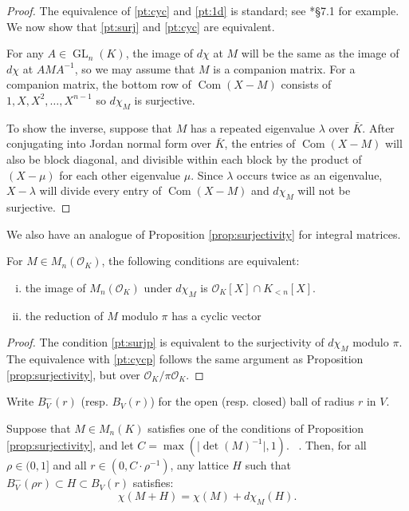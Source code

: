 \documentclass{sig-alternate-05-2015}
\DeclareMathOperator{\GL}{GL}
\DeclareMathOperator{\com}{Com}
\newcommand{\OK}{\mathcal{O}_K}
\def\todo#1{\ \!\!{\color{red} #1}}
\begin{document}
\begin{proof}
The equivalence of \eqref{pt:cyc} and \eqref{pt:1d} is standard; see
\cite{hoffman-kunze:LinearAlgebra}*{\S 7.1} for example.  We now show
that \eqref{pt:surj} and \eqref{pt:cyc} are equivalent.

For any $A \in \GL_n(K)$, the image of $d\chi$ at $M$ will be the same
as the image of $d\chi$ at $AMA^{-1}$, so we may assume that
$M$ is a companion matrix.  For a companion matrix, the bottom row of
$\com(X-M)$ consists of $1, X, X^2, \dots, X^{n-1}$ so $d\chi_M$ is surjective.

To show the inverse, suppose that $M$ has a repeated eigenvalue $\lambda$ over $\bar{K}$.
After conjugating into Jordan normal form over $\bar{K}$, the entries of $\com(X-M)$
will also be block diagonal, and divisible within each block by the product of $(X-\mu)$
for each other eigenvalue $\mu$.  Since $\lambda$ occurs twice as an eigenvalue,
$X - \lambda$ will divide every entry of $\com(X-M)$ and $d\chi_M$ will not be surjective.
\end{proof}

We also have an analogue of Proposition \ref{prop:surjectivity} for integral matrices.

\begin{prop}
\label{prop:intsurj}
For $M \in M_n(\OK)$, the following conditions are equivalent:
\begin{enumerate}[(i)]
\renewcommand{\itemsep}{0pt}
\item \label{pt:surjp} the image of $M_n(\OK)$ under $d\chi_M$ is $\OK[X] \cap K_{<n}[X]$.
\item \label{pt:cycp} the reduction of $M$ modulo $\pi$ has a cyclic vector
\end{enumerate}
\end{prop}
\begin{proof}
The condition \eqref{pt:surjp} is equivalent to the surjectivity of $d\chi_M$ modulo $\pi$.  The equivalence with
\eqref{pt:cycp} follows the same argument as Proposition \ref{prop:surjectivity}, but over $\OK / \pi\OK$.
\end{proof}

Write $B^-_V(r)$ (resp. $B_V(r)$) for the open (resp. closed) ball of radius $r$ in $V$.

\begin{prop} \label{prop:mainlem}
Suppose that $M \in M_n(K)$ satisfies one of the conditions of Proposition \ref{prop:surjectivity}, and
let $C = \max(\lvert \det(M)^{-1} \rvert, 1)$.  \todo{What if $\det(M) = 0$?}. Then, for all $\rho \in (0, 1]$ and all
$r \in (0, C \cdot \rho^{-1})$, any lattice $H$ such that $B_V^-(\rho r) \subset H \subset B_V(r)$
satisfies:
\begin{equation}
\chi(M + H) = \chi(M) + d\chi_M(H).
\end{equation}
\end{prop}
\end{document}
